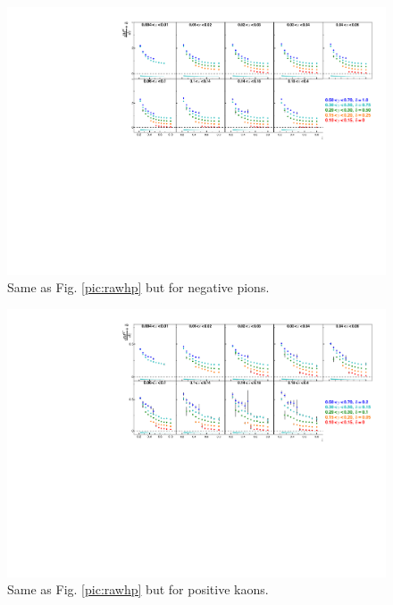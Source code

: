 \begin{figure}[!h]
  \includegraphics[scale=0.85]{./gfx/rawpim.pdf}
  \caption{Same as Fig. \ref{pic:rawhp} but for negative pions.}
  \label{pic:rawpim}
\end{figure}

\begin{figure}[!h]
  \includegraphics[scale=0.85]{./gfx/rawkp.pdf}
  \caption{Same as Fig. \ref{pic:rawhp} but for positive kaons.}
  \label{pic:rawkp}
\end{figure}

\newpage

